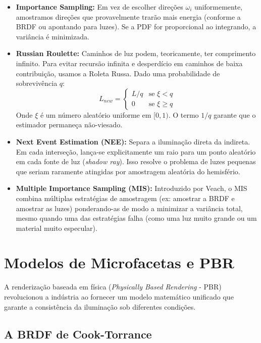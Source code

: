 \begin{itemize}
    \item \textbf{Importance Sampling:} Em vez de escolher direções $\omega_i$ uniformemente, amostramos direções que provavelmente trarão mais energia (conforme a BRDF ou apontando para luzes). Se a PDF for proporcional ao integrando, a variância é minimizada.
    \item \textbf{Russian Roulette:} Caminhos de luz podem, teoricamente, ter comprimento infinito. Para evitar recursão infinita e desperdício em caminhos de baixa contribuição, usamos a Roleta Russa. Dado uma probabilidade de sobrevivência $q$:
    \begin{equation}
        L_{new} = \begin{cases} L/q & \text{se } \xi < q \\ 0 & \text{se } \xi \ge q \end{cases}
    \end{equation}
    Onde $\xi$ é um número aleatório uniforme em $[0, 1)$. O termo $1/q$ garante que o estimador permaneça não-viesado.
    \item \textbf{Next Event Estimation (NEE):} Separa a iluminação direta da indireta. Em cada interseção, lança-se explicitamente um raio para um ponto aleatório em cada fonte de luz (\textit{shadow ray}). Isso resolve o problema de luzes pequenas que seriam raramente atingidas por amostragem aleatória do hemisfério.
    \item \textbf{Multiple Importance Sampling (MIS):} Introduzido por Veach, o MIS combina múltiplas estratégias de amostragem (ex: amostrar a BRDF e amostrar as luzes) ponderando-as de modo a minimizar a variância total, mesmo quando uma das estratégias falha (como uma luz muito grande ou um material muito especular).
\end{itemize}

\section{Modelos de Microfacetas e PBR}

A renderização baseada em física (\textit{Physically Based Rendering} - PBR) revolucionou a indústria ao fornecer um modelo matemático unificado que garante a consistência da iluminação sob diferentes condições.

\subsection{A BRDF de Cook-Torrance}

